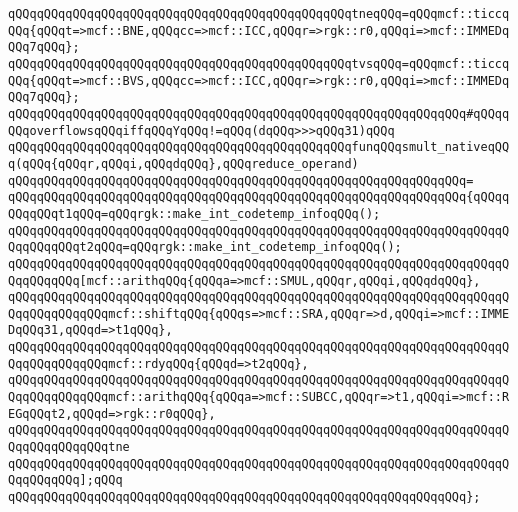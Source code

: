 \newline
\verb|qQQqqQQqqQQqqQQqqQQqqQQqqQQqqQQqqQQqqQQqqQQqqQQqtneqQQq=qQQqmcf::ticcqQQq{qQQqt=>mcf::BNE,qQQqcc=>mcf::ICC,qQQqr=>rgk::r0,qQQqi=>mcf::IMMEDqQQq7qQQq};|\newline
\verb|qQQqqQQqqQQqqQQqqQQqqQQqqQQqqQQqqQQqqQQqqQQqqQQqtvsqQQq=qQQqmcf::ticcqQQq{qQQqt=>mcf::BVS,qQQqcc=>mcf::ICC,qQQqr=>rgk::r0,qQQqi=>mcf::IMMEDqQQq7qQQq};|\newline
\newline
\verb|qQQqqQQqqQQqqQQqqQQqqQQqqQQqqQQqqQQqqQQqqQQqqQQqqQQqqQQqqQQqqQQq#qQQqqQQqoverflowsqQQqiffqQQqYqQQq!=qQQq(dqQQq>>>qQQq31)qQQq|\newline
\verb|qQQqqQQqqQQqqQQqqQQqqQQqqQQqqQQqqQQqqQQqqQQqqQQqfunqQQqsmult_nativeqQQq(qQQq{qQQqr,qQQqi,qQQqdqQQq},qQQqreduce_operand)|\newline
\verb|qQQqqQQqqQQqqQQqqQQqqQQqqQQqqQQqqQQqqQQqqQQqqQQqqQQqqQQqqQQqqQQq=|\newline
\verb|qQQqqQQqqQQqqQQqqQQqqQQqqQQqqQQqqQQqqQQqqQQqqQQqqQQqqQQqqQQqqQQq{qQQqqQQqqQQqt1qQQq=qQQqrgk::make_int_codetemp_infoqQQq();|\newline
\verb|qQQqqQQqqQQqqQQqqQQqqQQqqQQqqQQqqQQqqQQqqQQqqQQqqQQqqQQqqQQqqQQqqQQqqQQqqQQqqQQqt2qQQq=qQQqrgk::make_int_codetemp_infoqQQq();|\newline
\newline
\verb|qQQqqQQqqQQqqQQqqQQqqQQqqQQqqQQqqQQqqQQqqQQqqQQqqQQqqQQqqQQqqQQqqQQqqQQqqQQqqQQq[mcf::arithqQQq{qQQqa=>mcf::SMUL,qQQqr,qQQqi,qQQqdqQQq},|\newline
\verb|qQQqqQQqqQQqqQQqqQQqqQQqqQQqqQQqqQQqqQQqqQQqqQQqqQQqqQQqqQQqqQQqqQQqqQQqqQQqqQQqqQQqmcf::shiftqQQq{qQQqs=>mcf::SRA,qQQqr=>d,qQQqi=>mcf::IMMEDqQQq31,qQQqd=>t1qQQq},|\newline
\verb|qQQqqQQqqQQqqQQqqQQqqQQqqQQqqQQqqQQqqQQqqQQqqQQqqQQqqQQqqQQqqQQqqQQqqQQqqQQqqQQqqQQqmcf::rdyqQQq{qQQqd=>t2qQQq},|\newline
\verb|qQQqqQQqqQQqqQQqqQQqqQQqqQQqqQQqqQQqqQQqqQQqqQQqqQQqqQQqqQQqqQQqqQQqqQQqqQQqqQQqqQQqmcf::arithqQQq{qQQqa=>mcf::SUBCC,qQQqr=>t1,qQQqi=>mcf::REGqQQqt2,qQQqd=>rgk::r0qQQq},|\newline
\verb|qQQqqQQqqQQqqQQqqQQqqQQqqQQqqQQqqQQqqQQqqQQqqQQqqQQqqQQqqQQqqQQqqQQqqQQqqQQqqQQqqQQqtne|\newline
\verb|qQQqqQQqqQQqqQQqqQQqqQQqqQQqqQQqqQQqqQQqqQQqqQQqqQQqqQQqqQQqqQQqqQQqqQQqqQQqqQQq];qQQq|\newline
\verb|qQQqqQQqqQQqqQQqqQQqqQQqqQQqqQQqqQQqqQQqqQQqqQQqqQQqqQQqqQQqqQQq};|\newline
